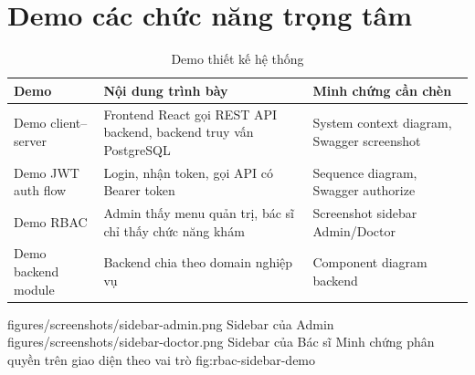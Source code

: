 \section{Demo các chức năng trọng tâm}

\begin{longtable}{|p{3.4cm}|p{5.5cm}|p{5.2cm}|}
\caption{Demo thiết kế hệ thống}\\
\hline
\textbf{Demo} & \textbf{Nội dung trình bày} & \textbf{Minh chứng cần chèn} \\
\hline
Demo client--server & Frontend React gọi REST API backend, backend truy vấn PostgreSQL & System context diagram, Swagger screenshot \\
\hline
Demo JWT auth flow & Login, nhận token, gọi API có Bearer token & Sequence diagram, Swagger authorize \\
\hline
Demo RBAC & Admin thấy menu quản trị, bác sĩ chỉ thấy chức năng khám & Screenshot sidebar Admin/Doctor \\
\hline
Demo backend module & Backend chia theo domain nghiệp vụ & Component diagram backend \\
\hline
\end{longtable}

\TwoDemoFigures
{figures/screenshots/sidebar-admin.png}
{Sidebar của Admin}
{figures/screenshots/sidebar-doctor.png}
{Sidebar của Bác sĩ}
{Minh chứng phân quyền trên giao diện theo vai trò}
{fig:rbac-sidebar-demo}
